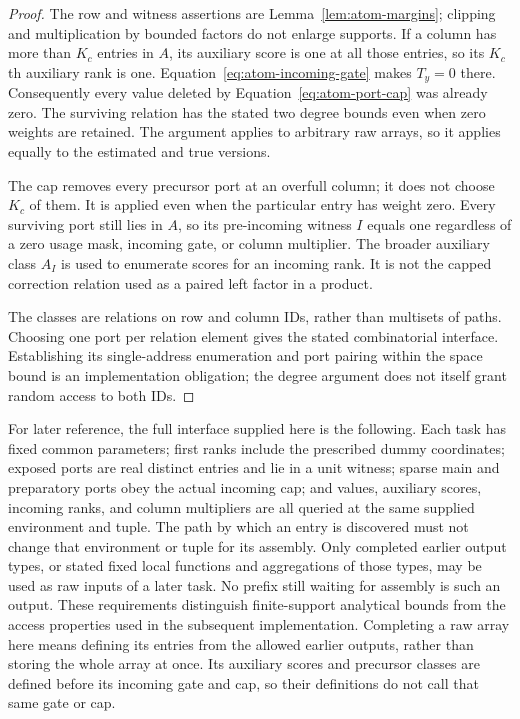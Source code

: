 \begin{proof}
The row and witness assertions are Lemma~\ref{lem:atom-margins}; clipping
and multiplication by bounded factors do not enlarge supports.
If a column has more than $K_c$ entries in $A$, its auxiliary score is
one at all those entries, so its $K_c$th auxiliary rank is one.
Equation~\eqref{eq:atom-incoming-gate} makes $T_y=0$ there.  Consequently
every value deleted by Equation~\eqref{eq:atom-port-cap} was already zero.
The surviving relation has the stated two degree bounds even when zero
weights are retained.  The argument applies to arbitrary raw arrays, so
it applies equally to the estimated and true versions.

The cap removes every precursor port at an overfull column; it does
not choose $K_c$ of them.  It is applied even when the particular entry
has weight zero.  Every surviving port still lies in $A$, so its
pre-incoming witness $I$ equals one regardless of a zero usage mask,
incoming gate, or column multiplier.  The broader auxiliary class
$A_I$ is used to enumerate scores for an incoming rank.  It is not the
capped correction relation used as a paired left factor in a product.

The classes are relations on row and column IDs, rather than multisets
of paths.  Choosing one port per relation element gives the stated
combinatorial interface.  Establishing its single-address enumeration
and port pairing within the space bound is an implementation obligation;
the degree argument does not itself grant random access to both IDs.
\end{proof}

For later reference, the full interface supplied here is the following.
Each task has fixed common parameters; first ranks include the prescribed
dummy coordinates; exposed ports are real distinct entries and lie in a
unit witness; sparse main and preparatory ports obey the actual incoming
cap; and values, auxiliary scores, incoming ranks, and column multipliers
are all queried at the same supplied environment and tuple.  The path
by which an entry is discovered must not change that environment or tuple
for its assembly.  Only completed earlier output types, or stated fixed local
functions and aggregations of those types, may be used as raw inputs of
a later task.  No prefix still waiting for assembly is such an output.
These requirements distinguish finite-support analytical bounds from
the access properties used in the subsequent implementation.
Completing a raw array here means defining its entries from the allowed
earlier outputs, rather than storing the whole array at once.  Its
auxiliary scores and precursor classes are defined before its incoming
gate and cap, so their definitions do not call that same gate or cap.

